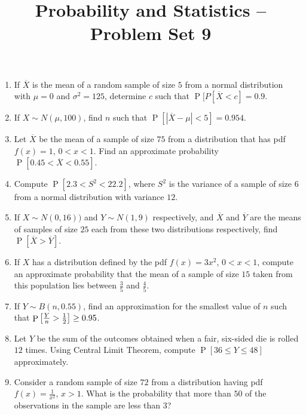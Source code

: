 \documentclass[svgnames]{amsart}
\title[]{Probability and Statistics -- Problem Set 9}
\DeclareMathOperator{\Prob}{P}
\begin{document}
\maketitle
\begin{enumerate}[leftmargin=*, itemsep=2mm]

\item If $\overline X$ is the mean of a random sample of size $5$ from a normal distribution with $\mu = 0$ and $\sigma^2 = 125$, determine $c$ such that $\Prob[P[\overline X < c] = 0.9$.

\item If $X \sim N(\mu, 100)$, find $n$ such that $\Prob[|\overline X - \mu| < 5] = 0.954$.

\item Let $\overline X$ be the mean of a sample of size $75$ from a distribution that has pdf $f(x) = 1$, $0 < x < 1$. Find an approximate probability $\Prob[0.45 < \overline X < 0.55]$.

\item Compute $\Prob[2.3 < S^2 < 22.2]$, where $S^2$ is the variance of a sample of size $6$ from a normal distribution with variance $12$.

\item If $X \sim N(0, 16))$ and $Y \sim N(1, 9)$ respectively, and $\overline X$ and $\overline Y$ are the means of samples of size $25$ each from these two distributions respectively, find $\Prob[\overline X > \overline Y]$.

\item If $X$ has a distribution defined by the pdf $f(x) = 3x^2$, $0 < x < 1$, compute an approximate probability that the mean of a sample of size $15$ taken from this population lies between $\frac 3 5$ and $\frac 4 5$.

\item If $Y \sim B(n, 0.55)$, find an approximation for the smallest value of $n$ such that $\Prob\bqty{\frac Y n > \frac 1 2} \ge 0.95$.

\item Let $Y$ be the sum of the outcomes obtained when a fair, six-sided die is rolled $12$ times. Using Central Limit Theorem, compute $\Prob[36 \le Y \le 48]$ approximately.

\item Consider a random sample of size $72$ from a distribution having pdf $f(x) = \frac 1 {x^2}$, $x > 1$. What is the probability that more than $50$ of the observations in the sample are less than $3$?


\end{enumerate}
\end{document}

